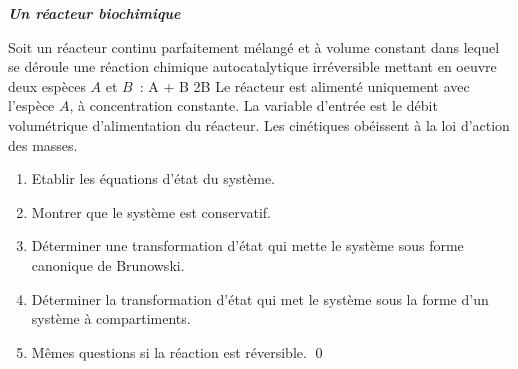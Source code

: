 \begin{exercice}{{\bf \em Un réacteur biochimique}}

Soit un réacteur continu parfaitement mélangé et à volume
constant dans lequel se déroule une réaction chimique autocatalytique
irréversible mettant en oeuvre deux espèces $A$ et $B$~:
\e
A + B \longrightarrow 2B
\ee
Le réacteur est alimenté uniquement avec l'espèce $A$, à
concentration constante. La variable d'entrée est le débit
volumétrique d'alimentation du réacteur. Les cinétiques obéissent
à la loi d'action des masses. 
\begin{enumerate}
\item Etablir les équations d'état du système.
\item Montrer que le système est conservatif.
\item Déterminer une transformation d'état qui mette le
système sous forme canonique de Brunowski.
\item Déterminer la transformation d'état qui met le système sous la forme d'un système à compartiments.
\item Mêmes questions si la réaction est réversible. \qed
\end{enumerate}
\end{exercice}
\vv

